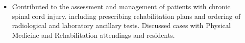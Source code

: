 \begin{cventries}
{\begin{cvitems}
\begin{itemize}
      \item {Contributed to the assessment and management of patients with chronic spinal cord injury, including prescribing rehabilitation plans and ordering of radiological and laboratory ancillary tests. Discussed cases with Physical Medicine and Rehabilitation attendings and residents.}
    \end{itemize}
  \end{cvitems}
  }
  \vspace{5pt}
 




\end{cventries}
